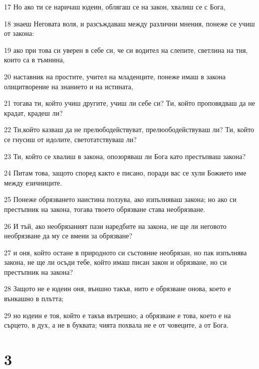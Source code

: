\par 17 Но ако ти се наричаш юдеин, облягаш се на закон, хвалиш се с Бога,
\par 18 знаеш Неговата воля, и разсъждаваш между различни мнения, понеже се учиш от закона:
\par 19 ако при това си уверен в себе си, че си водител на слепите, светлина на тия, които са в тъмнина,
\par 20 наставник на простите, учител на младенците, понеже имаш в закона олицитворение на знанието и на истината,
\par 21 тогава ти, който учиш другите, учиш ли себе си? Ти, който проповядваш да не крадат, крадеш ли?
\par 22 Ти,който казваш да не прелюбодействуват, прелюободействуваш ли? Ти, който се гнусиш от идолите, светотатствуваш ли?
\par 23 Ти, който се хвалиш в закона, опозоряваш ли Бога като престъпваш закона?
\par 24 Питам това, защото според както е писано, поради вас се хули Божието име между езичниците.
\par 25 Понеже обрязването наистина ползува, ако изпълняваш закона; но ако си престъпник на закона, тогава твоето обрязване става необрязване.
\par 26 И тъй, ако необрязаният пази наредбите на закона, не ще ли неговото необрязване да му се вмени за обрязване?
\par 27 и оня, който остане в природното си състояние необрязан, но пак изпълнява закона, не ще ли осъди тебе, който имаш писан закон и обрязване, но си престъпник на закона?
\par 28 Защото не е юдеин оня, външно такъв, нито е обрязване онова, което е вънкашно в плътта;
\par 29 но юдеин е тоя, който е такъв вътрешно; а обрязване е това, което е на сърцето, в дух, а не в буквата; чията похвала не е от човеците, а от Бога.

\chapter{3}

